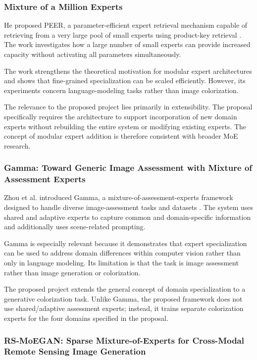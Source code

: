 \documentclass{FastFyp}
\begin{document}
\subsubsection{Mixture of a Million Experts}

He proposed PEER, a parameter-efficient expert retrieval mechanism capable of retrieving from a very large pool of small experts using product-key retrieval \cite{ref14}. The work investigates how a large number of small experts can provide increased capacity without activating all parameters simultaneously.

The work strengthens the theoretical motivation for modular expert architectures and shows that fine-grained specialization can be scaled efficiently. However, its experiments concern language-modeling tasks rather than image colorization.

The relevance to the proposed project lies primarily in extensibility. The proposal specifically requires the architecture to support incorporation of new domain experts without rebuilding the entire system or modifying existing experts. The concept of modular expert addition is therefore consistent with broader MoE research.

\subsubsection{Gamma: Toward Generic Image Assessment with Mixture of Assessment Experts}

Zhou et al. introduced Gamma, a mixture-of-assessment-experts framework designed to handle diverse image-assessment tasks and datasets \cite{ref15}. The system uses shared and adaptive experts to capture common and domain-specific information and additionally uses scene-related prompting.

Gamma is especially relevant because it demonstrates that expert specialization can be used to address domain differences within computer vision rather than only in language modeling. Its limitation is that the task is image assessment rather than image generation or colorization.

The proposed project extends the general concept of domain specialization to a generative colorization task. Unlike Gamma, the proposed framework does not use shared/adaptive assessment experts; instead, it trains separate colorization experts for the four domains specified in the proposal.

\subsubsection{RS-MoEGAN: Sparse Mixture-of-Experts for Cross-Modal Remote Sensing Image Generation}
\end{document}

